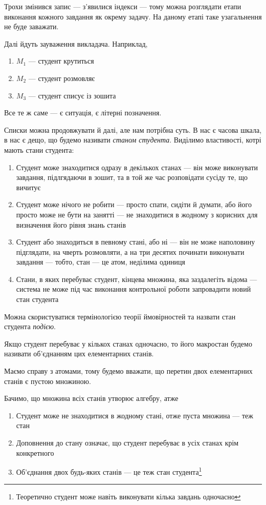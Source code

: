 Трохи змінився запис --- з’явилися індекси --- тому можна розглядати етапи
виконання кожного завдання як окрему задачу.
На даному етапі таке узагальнення не буде заважати.

Далі йдуть зауваження викладача. Наприклад,
\begin{enumerate}
  \item
    $M_1$ --- студент крутиться
  \item
    $M_2$ --- студент розмовляє
  \item
    $M_3$ --- студент списує із зошита
\end{enumerate}

Все те ж саме --- є ситуація, є літерні позначення.

Списки можна продовжувати й далі, але нам потрібна суть.
В нас є часова шкала, в нас є дещо, що будемо називати
\textit{станом студента}.
Виділимо властивості, котрі мають стани студента:

\begin{enumerate}
  \item 
    Студент може знаходитися одразу в декількох станах --- він може
    виконувати завдання, підлгядаючи в зошит, та в той же час розповідати
    сусіду те, що вичитує
  \item
    Студент може нічого не робити --- просто спати, сидіти й думати,
    або його просто може не бути на занятті --- не знаходитися в жодному з
    корисних для визначення його рівня знань станів
  \item
    Студент або знаходиться в певному стані, або ні ---
    він не може наполовину підглядати, на чверть розмовляти, а на три
    десятих починати виконувати завдання --- тобто, стан --- це атом,
    неділима одиниця
  \item
    Стани, в яких перебуває студент, кінцева множина, яка заздалегіть відома
    --- система не може під час виконання контрольної роботи запровадити
    новий стан студента
\end{enumerate}

Можна скористуватися термінологією теорії ймовірностей та назвати стан
студента \textit{подією}.

Якщо студент перебуває у кількох станах одночасно, то його макростан будемо
називати об’єднанням цих елементарних станів.

Маємо справу з атомами, тому будемо вважати, що перетин двох елементарних
станів є пустою множиною.

Бачимо, що множина всіх станів утворює алгебру, атже
\begin{enumerate}
  \item
    Студент може не знаходитися в жодному стані, отже пуста множина --- теж
    стан
  \item
    Доповнення до стану означає, що студент перебуває в усіх станах крім
    конкретного
  \item
    Об’єднання двох будь-яких станів --- це теж стан студента\footnote{
    Теоретично студент може навіть виконувати кілька завдань одночасно}
\end{enumerate}

